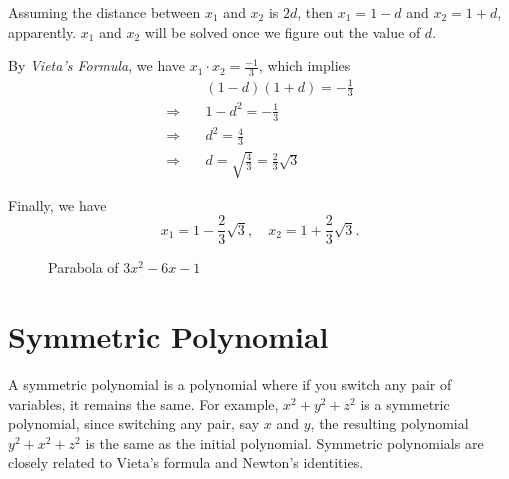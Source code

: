 \documentclass[11pt, oneside]{article}   	%
\begin{document}
Assuming the distance between $x_1$ and $x_2$ is $2d$, then $x_1 = 1-d$ and $x_2 = 1+d$, apparently. $x_1$ and $x_2$ will be solved once we figure out the value of $d$. 

By \emph{Vieta's Formula}, we have $x_1\cdot x_2 = \frac{-1}{3}$, which implies 
\begin{align*}
&(1-d)(1+d) = -\frac{1}{3}\\
\Rightarrow \quad & 1-d^2 = -\frac{1}{3}\\
\Rightarrow \quad & d^2 = \frac{4}{3}\\
\Rightarrow \quad & d= \sqrt{\frac{4}{3}} = \frac{2}{3}\sqrt{3}
\end{align*}

Finally, we have
\[x_1= 1-\frac{2}{3}\sqrt{3}, \quad x_2 = 1+\frac{2}{3}\sqrt{3}.\]

\begin{figure}
\centering 
{}
\caption{Parabola of $3x^2 - 6x -1$}
\label{fig:parabola}
\end{figure}

\newpage
\section{Symmetric Polynomial}
A symmetric polynomial is a polynomial where if you switch any pair of variables, it remains the same. For example, $x^2+y^2+z^2$ is a symmetric polynomial, since switching any pair, say $x$ and $y$, the resulting polynomial $y^2+x^2+z^2$ is the same as the initial polynomial. Symmetric polynomials are closely related to Vieta's formula and Newton's identities. 
\end{document}
